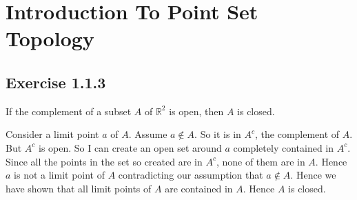 \section*{Introduction To Point Set Topology}
\subsection*{Exercise 1.1.3}
If the complement of a subset $A$ of $\mathbb{R}^2$ is open, 
then $A$ is closed.

Consider a limit point $a$ of $A$. Assume $a \notin A$. So it is in
$A^c$, the complement of $A$. But $A^c$ is open. So I can create an open
set around $a$ completely contained in $A^c$. Since all the points in the
set so created are in $A^c$, none of them are in $A$. Hence $a$ is not a
limit point of $A$ contradicting our assumption that $a \notin A$. Hence
we have shown that all limit points of $A$ are contained in $A$. Hence
$A$ is closed.


